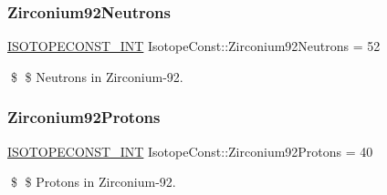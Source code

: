 \subsubsection{\texorpdfstring{Zirconium92\+Neutrons}{Zirconium92Neutrons}}
{\footnotesize\ttfamily \mbox{\hyperlink{group___isotope_const-_macros_ga5f18360b3e99483a35c32d789e62621c}{I\+S\+O\+T\+O\+P\+E\+C\+O\+N\+S\+T\+\_\+\+I\+NT}} Isotope\+Const\+::\+Zirconium92\+Neutrons = 52}

\$ \$ Neutrons in Zirconium-\/92. \mbox{\label{group___isotope_const-_zirconium-_zr92_ga2a71ec97e69a6f6b41298e53ef76d228}} 
\subsubsection{\texorpdfstring{Zirconium92\+Protons}{Zirconium92Protons}}
{\footnotesize\ttfamily \mbox{\hyperlink{group___isotope_const-_macros_ga5f18360b3e99483a35c32d789e62621c}{I\+S\+O\+T\+O\+P\+E\+C\+O\+N\+S\+T\+\_\+\+I\+NT}} Isotope\+Const\+::\+Zirconium92\+Protons = 40}

\$ \$ Protons in Zirconium-\/92. 